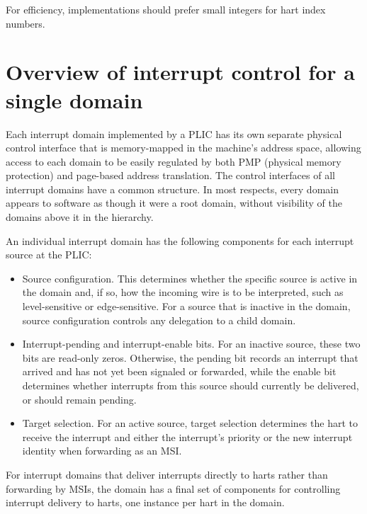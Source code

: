 \begin{commentary}
For efficiency, implementations should prefer small integers for hart
index numbers.
\end{commentary}

\section{Overview of interrupt control for a single domain}

Each interrupt domain implemented by a PLIC has its own separate
physical control interface that is memory-mapped in the machine's
address space, allowing access to each domain to be easily regulated
by both PMP (physical memory protection) and page-based address
translation.
The control interfaces of all interrupt domains have a common
structure.
In most respects, every domain appears to software as though it were
a root domain, without visibility of the domains above it in the
hierarchy.

An individual interrupt domain has the following components for each
interrupt source at the PLIC:
\begin{itemize}

\item
Source configuration.
This determines whether the specific source is active in the domain
and, if so, how the incoming wire is to be interpreted, such as
level-sensitive or edge-sensitive.
For a source that is inactive in the domain, source configuration
controls any delegation to a child domain.

\item
Interrupt-pending and interrupt-enable bits.
For an inactive source, these two bits are read-only zeros.
Otherwise, the pending bit records an interrupt that arrived and has
not yet been signaled or forwarded, while the enable bit determines
whether interrupts from this source should currently be delivered, or
should remain pending.

\item
Target selection.
For an active source, target selection determines the hart to receive
the interrupt and either the interrupt's priority or the new interrupt
identity when forwarding as an MSI.

\end{itemize}

For interrupt domains that deliver interrupts directly to harts rather
than forwarding by MSIs, the domain has a final set of components for
controlling interrupt delivery to harts, one instance per hart in the
domain.

